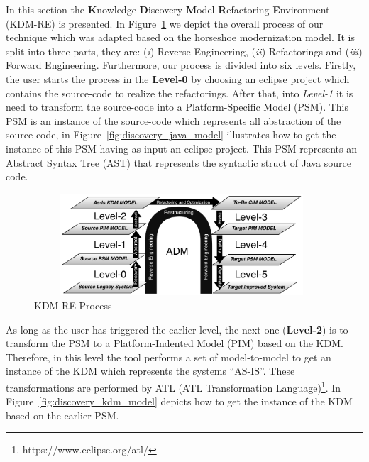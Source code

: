 In this section the \textbf{K}nowledge \textbf{D}iscovery \textbf{M}odel-\textbf{R}efactoring \textbf{E}nvironment (KDM-RE) is presented. 
In Figure~\ref{fig:process} we depict the overall process of our technique which was adapted based on the horseshoe modernization model. 
It is split into three parts, they are: 
(\textit{i}) Reverse Engineering, 
(\textit{ii}) Refactorings and 
(\textit{iii}) Forward Engineering. 
Furthermore, our process is divided into six levels. 
Firstly, the user starts the process in the \textbf{Level-0} by choosing an eclipse project which contains the source-code to realize the refactorings.  
After that, into \textit{Level-1} it is need to transform the source-code into a Platform-Specific Model (PSM). 
This PSM is an instance of the source-code which represents all abstraction of the source-code, in Figure~\ref{fig:discovery_java_model} illustrates how to get the instance of this PSM having as input an eclipse project. 
This PSM represents an Abstract Syntax Tree (AST) that represents the syntactic struct of Java source code.

\begin{figure}[!ht]
\centering
  \includegraphics[width=11cm, height=3.8cm]{figure/processoDaFerramenta}
\caption{KDM-RE Process}
\label{fig:process}
\end{figure} 

As long as the user has triggered the earlier level, the next one (\textbf{Level-2}) is to transform the PSM to a Platform-Indented Model (PIM) based on the KDM. 
Therefore, in this level the tool performs a set of model-to-model to get an instance of the KDM which represents the systems ``AS-IS''. These transformations are performed by ATL (ATL Transformation Language)\footnote{https://www.eclipse.org/atl/}.
In Figure~\ref{fig:discovery_kdm_model} depicts how to get the instance of the KDM based on the earlier PSM.

